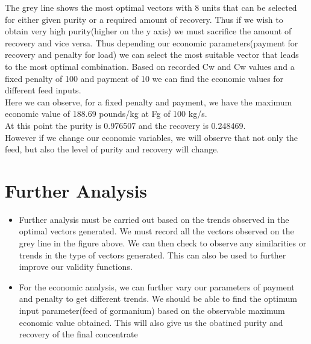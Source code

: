 \documentclass[twoside,twocolumn]{article}
\begin{document}
The grey line shows the most optimal vectors with 8 units that can be selected for either given purity or a required amount of recovery.
Thus if we wish to obtain very high purity(higher on the y axis) we must sacrifice the amount of recovery and vice versa. Thus depending our economic parameters(payment for recovery and penalty for load) we can select the most suitable vector that leads to the most optimal combination.
Based on recorded Cw and Cw values and a fixed penalty of 100 and payment of 10 we can find the economic values for different feed inputs. \\
Here we can observe, for a fixed penalty and payment, we have the maximum economic value of 188.69 pounds/kg at Fg of 100 kg/s. \\
At this point the purity is 0.976507 and the recovery is 0.248469.  \\
However if we change our economic variables, we will observe that not only the feed, but also the level of purity and recovery will change. \\

\section{Further Analysis}

\begin{itemize}
\item Further analysis must be carried out based on the trends observed in the optimal vectors generated. We must record all the vectors observed on the grey line in the figure above. We can then check to observe any similarities or trends in the type of vectors generated. This can also be used to further improve our validity functions.

\item For the economic analysis, we can further vary our parameters of payment and penalty to get different trends. We should be able to find the optimum input parameter(feed of gormanium) based on the observable maximum economic value obtained. This will also give us the obatined purity and recovery of the final concentrate


\end{itemize}



\end{document}
